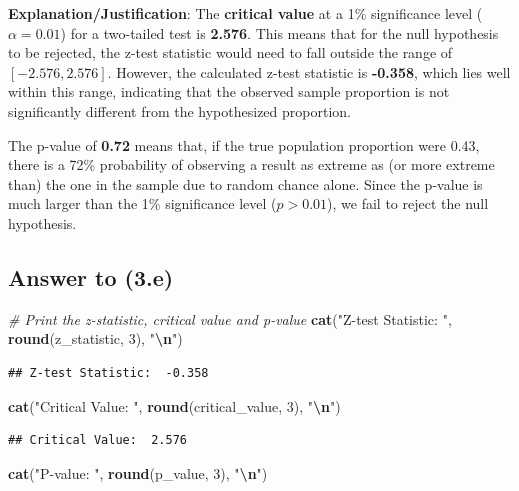 \documentclass[
  11pt,
]{article}
\newenvironment{Shaded}{\begin{snugshade}}{\end{snugshade}}
\newcommand{\CommentTok}[1]{\textcolor[rgb]{0.56,0.35,0.01}{\textit{#1}}}
\newcommand{\DecValTok}[1]{\textcolor[rgb]{0.00,0.00,0.81}{#1}}
\newcommand{\FunctionTok}[1]{\textcolor[rgb]{0.13,0.29,0.53}{\textbf{#1}}}
\newcommand{\NormalTok}[1]{#1}
\newcommand{\SpecialCharTok}[1]{\textcolor[rgb]{0.81,0.36,0.00}{\textbf{#1}}}
\newcommand{\StringTok}[1]{\textcolor[rgb]{0.31,0.60,0.02}{#1}}
\begin{document}
\textbf{Explanation/Justification}: The \textbf{critical value} at a 1\%
significance level (\(\alpha = 0.01\)) for a two-tailed test is
\textbf{2.576}. This means that for the null hypothesis to be rejected,
the z-test statistic would need to fall outside the range of
\([-2.576, 2.576]\). However, the calculated z-test statistic is
\textbf{-0.358}, which lies well within this range, indicating that the
observed sample proportion is not significantly different from the
hypothesized proportion.

The p-value of \textbf{0.72} means that, if the true population
proportion were 0.43, there is a 72\% probability of observing a result
as extreme as (or more extreme than) the one in the sample due to random
chance alone. Since the p-value is much larger than the 1\% significance
level (\(p > 0.01\)), we fail to reject the null hypothesis.

\subsection{Answer to (3.e)}\label{answer-to-3.e}

\begin{Shaded}
\begin{Highlighting}[]
\CommentTok{\# Print the z{-}statistic, critical value and p{-}value}
\FunctionTok{cat}\NormalTok{(}\StringTok{"Z{-}test Statistic: "}\NormalTok{, }\FunctionTok{round}\NormalTok{(z\_statistic, }\DecValTok{3}\NormalTok{), }\StringTok{"}\SpecialCharTok{\textbackslash{}n}\StringTok{"}\NormalTok{)}
\end{Highlighting}
\end{Shaded}

\begin{verbatim}
## Z-test Statistic:  -0.358
\end{verbatim}

\begin{Shaded}
\begin{Highlighting}[]
\FunctionTok{cat}\NormalTok{(}\StringTok{"Critical Value: "}\NormalTok{, }\FunctionTok{round}\NormalTok{(critical\_value, }\DecValTok{3}\NormalTok{), }\StringTok{"}\SpecialCharTok{\textbackslash{}n}\StringTok{"}\NormalTok{)}
\end{Highlighting}
\end{Shaded}

\begin{verbatim}
## Critical Value:  2.576
\end{verbatim}

\begin{Shaded}
\begin{Highlighting}[]
\FunctionTok{cat}\NormalTok{(}\StringTok{"P{-}value: "}\NormalTok{, }\FunctionTok{round}\NormalTok{(p\_value, }\DecValTok{3}\NormalTok{), }\StringTok{"}\SpecialCharTok{\textbackslash{}n}\StringTok{"}\NormalTok{)}
\end{Highlighting}
\end{Shaded}
\end{document}
